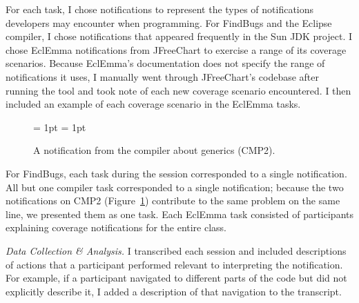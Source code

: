 \documentclass{llncs}
\begin{document}
For each task, I chose notifications to represent the types of notifications developers may encounter when programming.
For FindBugs and the Eclipse compiler, I chose notifications that appeared frequently in the Sun JDK project. I chose EclEmma notifications from JFreeChart to exercise a range of its coverage scenarios. Because EclEmma's documentation does not specify the range of notifications it uses, I manually went through JFreeChart's codebase after running the tool and took note of each new coverage scenario encountered. I then included an example of each coverage scenario in the EclEmma tasks.

\begin{figure} [h]
	\subfigcapskip = 1pt
	\centering
			\subfigcapskip = 1pt
					
					\caption{A notification from the compiler about generics (CMP2).}
					\label{fig:CMP2} 
\end{figure}

For FindBugs, each task during the session corresponded to a single notification.
All but one compiler task corresponded to a single notification; because the two notifications on CMP2 (Figure~\ref{fig:CMP2}) contribute to the same problem on the same line, we presented them as one task. 
Each EclEmma task consisted of participants explaining coverage notifications for the entire class. 

\vspace{0.5em}
\noindent\textit{Data Collection \& Analysis.}
I transcribed each session and included descriptions of actions that a participant performed relevant to interpreting the notification. 
For example, if a participant navigated to different parts of the code but did not explicitly describe it, I added a description of that navigation to the transcript.
\end{document}
